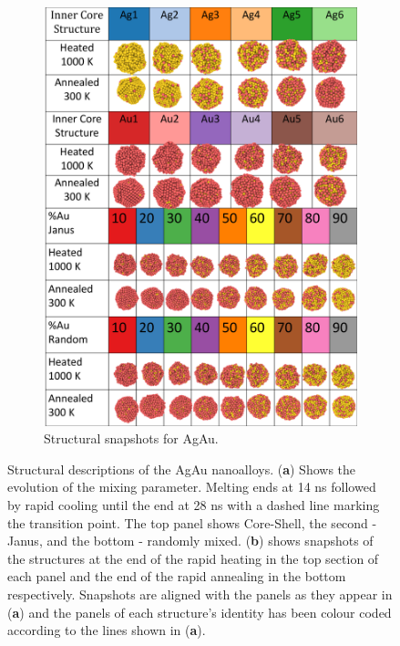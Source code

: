 \begin{figure}
\begin{subfigure}{0.39\textwidth}
    \label{fig:AgAuMix}
\end{subfigure}
\begin{subfigure}{0.56\textwidth}
    \includegraphics[width=\linewidth]{figures/MD/Alloys/AgAu_Struts.pdf}
    \caption{Structural snapshots for AgAu.}
    \label{fig:AgAu_Struts}
\end{subfigure}
    \caption{Structural descriptions of the AgAu nanoalloys. (\textbf{a}) Shows the evolution of the mixing parameter. Melting ends at 14 ns followed by rapid cooling until the end at 28 ns with a dashed line marking the transition point. The top panel shows Core-Shell, the second - Janus, and the bottom - randomly mixed. (\textbf{b}) shows snapshots of the structures at the end of the rapid heating in the top section of each panel and the end of the rapid annealing in the bottom respectively. Snapshots are aligned with the panels as they appear in (\textbf{a}) and the panels of each structure's identity has been colour coded according to the lines shown in (\textbf{a}).}
    \label{fig:AgAu_NA}
\end{figure}


